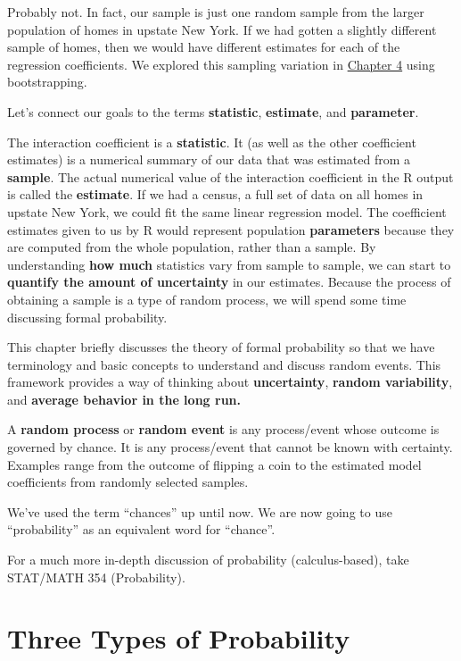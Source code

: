 \documentclass[]{book}
\begin{document}
Probably not. In fact, our sample is just one random sample from the larger population of homes in upstate New York. If we had gotten a slightly different sample of homes, then we would have different estimates for each of the regression coefficients. We explored this sampling variation in \protect\hyperlink{random-variability}{Chapter 4} using bootstrapping.

Let's connect our goals to the terms \textbf{statistic}, \textbf{estimate}, and \textbf{parameter}.

The interaction coefficient is a \textbf{statistic}. It (as well as the other coefficient estimates) is a numerical summary of our data that was estimated from a \textbf{sample}. The actual numerical value of the interaction coefficient in the R output is called the \textbf{estimate}. If we had a census, a full set of data on all homes in upstate New York, we could fit the same linear regression model. The coefficient estimates given to us by R would represent population \textbf{parameters} because they are computed from the whole population, rather than a sample. By understanding \textbf{how much} statistics vary from sample to sample, we can start to \textbf{quantify the amount of uncertainty} in our estimates. Because the process of obtaining a sample is a type of random process, we will spend some time discussing formal probability.

This chapter briefly discusses the theory of formal probability so that we have terminology and basic concepts to understand and discuss random events. This framework provides a way of thinking about \textbf{uncertainty}, \textbf{random variability}, and \textbf{average behavior in the long run.}

A \textbf{random process} or \textbf{random event} is any process/event whose outcome is governed by chance. It is any process/event that cannot be known with certainty. Examples range from the outcome of flipping a coin to the estimated model coefficients from randomly selected samples.

We've used the term ``chances'' up until now. We are now going to use ``probability'' as an equivalent word for ``chance''.

For a much more in-depth discussion of probability (calculus-based), take STAT/MATH 354 (Probability).

\hypertarget{three-types-of-probability}{%
\section{Three Types of Probability}\label{three-types-of-probability}}
\end{document}
